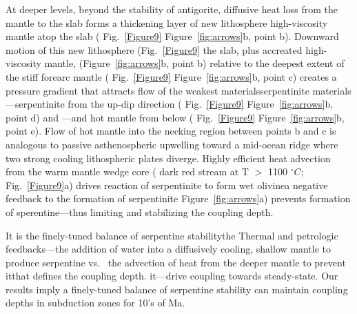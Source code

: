 \documentclass[draft,linenumbers]{agujournal2018} %
\providecommand{\DIFaddtex}[1]{{\protect\color{blue} \sf #1}} %
\providecommand{\DIFdeltex}[1]{{\protect\color{red} \scriptsize #1}} %
\providecommand{\DIFaddbegin}{} %
\providecommand{\DIFaddend}{} %
\providecommand{\DIFdelbegin}{} %
\providecommand{\DIFdelend}{} %
\providecommand{\DIFadd}[1]{\texorpdfstring{\DIFaddtex{#1}}{#1}} %
\providecommand{\DIFdel}[1]{\texorpdfstring{\DIFdeltex{#1}}{}} %
\newcommand{\DIFscaledelfig}{0.3}
\newlength{\DIFdelgraphicswidth} %
\newlength{\DIFdelgraphicsheight} %
\newcommand{\DIFaddincludegraphics}[2][]{{\color{blue}\fbox{\DIFOincludegraphics[#1]{#2}}}} %
\newcommand{\DIFdelincludegraphics}[2][]{%
\sbox{\DIFdelgraphicsbox}{\DIFOincludegraphics[#1]{#2}}%
\settoboxwidth{\DIFdelgraphicswidth}{\DIFdelgraphicsbox} %
\settoboxtotalheight{\DIFdelgraphicsheight}{\DIFdelgraphicsbox} %
\scalebox{\DIFscaledelfig}{%
\parbox[b]{\DIFdelgraphicswidth}{\usebox{\DIFdelgraphicsbox}\\[-\baselineskip] \rule{\DIFdelgraphicswidth}{0em}}\llap{\resizebox{\DIFdelgraphicswidth}{\DIFdelgraphicsheight}{%
\setlength{\unitlength}{\DIFdelgraphicswidth}%
\begin{picture}(1,1)%
\thicklines\linethickness{2pt} %
{\color[rgb]{1,0,0}\put(0,0){\framebox(1,1){}}}%
{\color[rgb]{1,0,0}\put(0,0){\line( 1,1){1}}}%
{\color[rgb]{1,0,0}\put(0,1){\line(1,-1){1}}}%
\end{picture}%
}\hspace*{3pt}}} %
} %
\DeclareRobustCommand{\DIFaddbegin}{\DIFOaddbegin \let\includegraphics\DIFaddincludegraphics} %
\DeclareRobustCommand{\DIFaddend}{\DIFOaddend \let\includegraphics\DIFOincludegraphics} %
\DeclareRobustCommand{\DIFdelbegin}{\DIFOdelbegin \let\includegraphics\DIFdelincludegraphics} %
\DeclareRobustCommand{\DIFdelend}{\DIFOaddend \let\includegraphics\DIFOincludegraphics} %
\begin{document}
At deeper levels, beyond the stability of antigorite, diffusive heat
loss from the mantle to the slab forms a thickening layer of
\DIFdelbegin \DIFdel{new lithosphere }\DIFdelend \DIFaddbegin \DIFadd{high-viscosity mantle }\DIFaddend atop the slab (\DIFdelbegin \DIFdel{Fig.~\ref{Figure9}}\DIFdelend \DIFaddbegin \DIFadd{Figure~\ref{fig:arrows}}\DIFaddend b, point b).
Downward motion of \DIFdelbegin \DIFdel{this new lithosphere (Fig.~\ref{Figure9}}\DIFdelend \DIFaddbegin \DIFadd{the slab, plus accreated high-viscosity mantle,
(Figure~\ref{fig:arrows}}\DIFaddend b, point b) relative to the deepest extent of
the stiff forearc mantle (\DIFdelbegin \DIFdel{Fig.~\ref{Figure9}}\DIFdelend \DIFaddbegin \DIFadd{Figure~\ref{fig:arrows}}\DIFaddend b, point c) creates a
pressure gradient that attracts flow of the weakest
\DIFdelbegin \DIFdel{materials\textemdash serpentinite }\DIFdelend \DIFaddbegin \DIFadd{materials---serpentinite }\DIFaddend from the up-dip direction
(\DIFdelbegin \DIFdel{Fig.~\ref{Figure9}}\DIFdelend \DIFaddbegin \DIFadd{Figure~\ref{fig:arrows}b}\DIFaddend , point d)\DIFdelbegin \DIFdel{\textemdash and }\DIFdelend \DIFaddbegin \DIFadd{---and }\DIFaddend hot mantle from below
(\DIFdelbegin \DIFdel{Fig.~\ref{Figure9}}\DIFdelend \DIFaddbegin \DIFadd{Figure~\ref{fig:arrows}b}\DIFaddend , point e). Flow of hot mantle into the necking
region between points b and c is analogous to passive asthenospheric
upwelling toward a mid-ocean ridge where two strong cooling lithospheric
plates diverge. Highly efficient heat advection from the warm mantle
wedge core (\DIFdelbegin \DIFdel{dark red stream at T $>$ 1100 $^{\circ}C$; Fig.~\ref{Figure9}a) drives reaction of serpentinite to form wet olivine\textemdash a negative feedback to the formation of
serpentinite}\DIFdelend \DIFaddbegin \DIFadd{Figure~\ref{fig:arrows}a) prevents formation of
sperentine---thus limiting and stabilizing the coupling depth}\DIFaddend .

\DIFdelbegin \DIFdel{It is the finely-tuned balance of serpentine stability\textemdash the }\DIFdelend \DIFaddbegin \DIFadd{Thermal and petrologic feedbacks---the }\DIFaddend addition of water into a
diffusively cooling, shallow mantle to produce serpentine vs.\DIFaddbegin \DIFadd{~}\DIFaddend the
advection of heat from the deeper mantle to prevent \DIFdelbegin \DIFdel{it\textemdash that defines the coupling
depth. }\DIFdelend \DIFaddbegin \DIFadd{it---drive coupling
towards steady-state. Our results imply a finely-tuned balance of
serpentine stability can maintain coupling depths in subduction zones
for 10's of Ma.
}\DIFaddend
\end{document}
